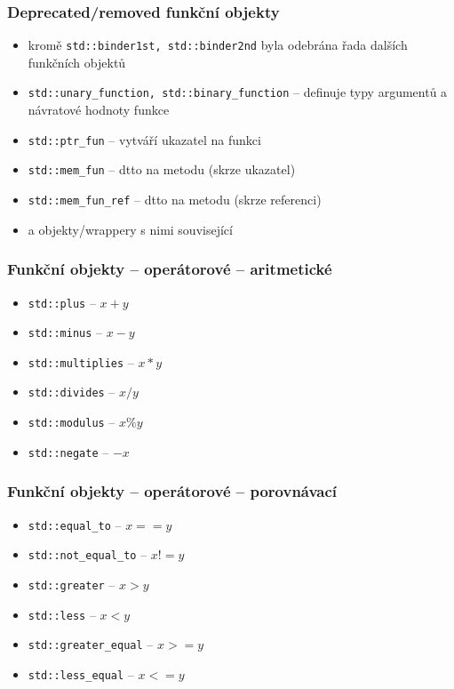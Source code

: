 \begin{frame}[fragile]
\frametitle{Deprecated/removed funkční objekty}

\begin{oldblock}{}
\begin{itemize}
\item kromě \lstinline|std::binder1st, std::binder2nd| byla odebrána řada dalších funkčních objektů
\item \lstinline|std::unary_function, std::binary_function| -- definuje typy argumentů a návratové hodnoty funkce
\item \lstinline|std::ptr_fun| -- vytváří  ukazatel na funkci
\item \lstinline|std::mem_fun| -- dtto na metodu (skrze ukazatel)
\item \lstinline|std::mem_fun_ref| --  dtto na metodu (skrze referenci)
\item a objekty/wrappery s nimi související
\end{itemize}
\end{oldblock}
\end{frame}


\begin{frame}[fragile]
\frametitle{Funkční objekty -- operátorové -- aritmetické}
\begin{block}{}
\begin{itemize}
\item \lstinline|std::plus| -- $x + y$
\item \lstinline|std::minus| -- $x - y$
\item \lstinline|std::multiplies| -- $x * y$
\item \lstinline|std::divides| -- $x / y$
\item \lstinline|std::modulus| -- $x \% y$
\item \lstinline|std::negate| -- $-x$
\end{itemize}
\end{block}
\end{frame}


\begin{frame}[fragile]
\frametitle{Funkční objekty -- operátorové -- porovnávací}
\begin{block}{}
\begin{itemize}
\item \lstinline|std::equal_to| -- $x == y$
\item \lstinline|std::not_equal_to| -- $x != y$
\item \lstinline|std::greater| -- $x > y$
\item \lstinline|std::less| -- $x < y$
\item \lstinline|std::greater_equal| -- $x >= y$
\item \lstinline|std::less_equal| -- $x <= y$
\end{itemize}
\end{block}
\end{frame}

